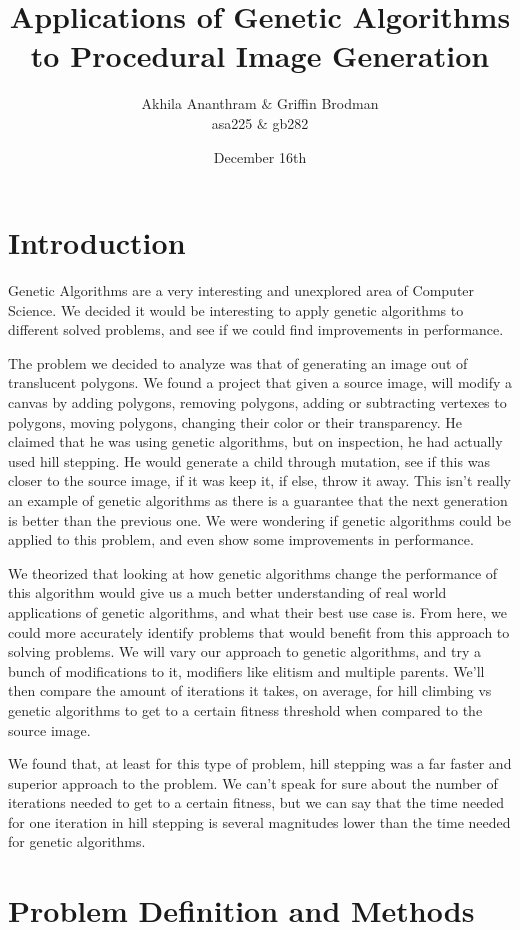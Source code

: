 \documentclass[12pt,letterpaper]{article}
\author{Akhila Ananthram $\&$ Griffin Brodman\\asa225 $\&$ gb282}
\title{Applications of Genetic Algorithms to Procedural Image Generation }
\date{December 16th}
\begin{document}
\maketitle
\section{Introduction}
Genetic Algorithms are a very interesting and unexplored area of Computer Science. We decided it would be interesting to apply genetic algorithms to different solved problems, and see if we could find improvements in performance. 

The problem we decided to analyze was that of generating an image out of translucent polygons. We found a project that given a source image, will modify a canvas by adding polygons, removing polygons, adding or subtracting vertexes to polygons, moving polygons, changing their color or their transparency. He claimed that he was using genetic algorithms, but on inspection, he had actually used hill stepping. He would generate a child through mutation, see if this was closer to the source image, if it was keep it, if else, throw it away. This isn't really an example of genetic algorithms as there is a guarantee that the next generation is better than the previous one. We were wondering if genetic algorithms could be applied to this problem, and even show some improvements in performance. 

We theorized that looking at how genetic algorithms change the performance of this algorithm would give us a much better understanding of real world applications of genetic algorithms, and what their best use case is. From here, we could more accurately identify problems that would benefit from this approach to solving problems. We will vary our approach to genetic algorithms, and try a bunch of modifications to it, modifiers like elitism and multiple parents. We'll then compare the amount of iterations it takes, on average, for hill climbing vs genetic algorithms to get to a certain fitness threshold when compared to the source image.

We found that, at least for this type of problem, hill stepping was a far faster and superior approach to the problem. We can't speak for sure about the number of iterations needed to get to a certain fitness, but we can say that the time needed for one iteration in hill stepping is several magnitudes lower than the time needed for genetic algorithms.


\section{Problem Definition and Methods}
\end{document}
